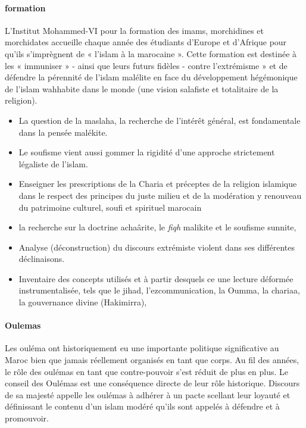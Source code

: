 \paragraph{formation}
L'Institut Mohammed-VI pour la formation des imams, morchidines et morchidates  
 accueille chaque année des étudiants d'Europe et d'Afrique pour qu'ils s'imprègnent de « l'islam à la marocaine ». Cette formation est destinée à les « immuniser » - ainsi que leurs futurs fidèles - contre l'extrémisme » et de  défendre la pérennité de l'islam malélite en face du développement hégémonique de l'islam wahhabite dans le monde (une vision salafiste et totalitaire de la religion).
 \begin{itemize}
     \item La question de la maslaha, la recherche de l'intérêt général, est fondamentale dans la pensée malékite.
     \item  Le soufisme vient aussi gommer la rigidité d'une approche strictement légaliste de l'islam.
     

\item Enseigner les prescriptions de la Charia et préceptes de la religion islamique dans le respect des principes du juste milieu et de la modération y renouveau du patrimoine culturel, soufi et spirituel marocain 
\item la recherche sur la doctrine achaârite, le \textit{fiqh} malikite et le soufisme sunnite,
\item Analyse (déconstruction) du discours extrémiste violent dans ses différentes déclinaisons.
\item Inventaire des concepts utilisés et à partir desquels ce une lecture déformée instrumentalisée, tels que le jihad, l'ezcommunication, la Oumma, la chariaa, la gouvernance divine (Hakimirra),
 \end{itemize}
  






\paragraph{Oulemas} Les ouléma ont historiquement eu une importante politique significative au Maroc bien que jamais réellement organisés en tant que corps.
  Au fil des années, le rôle des oulémas en tant que contre-pouvoir s'est réduit de plus en plus.
Le conseil des Oulémas est une conséquence directe de leur rôle historique. 
Discours de sa majesté appelle les oulémas à adhérer à un pacte scellant leur loyauté et définissant le contenu d'un islam modéré qu'ils sont appelés à défendre et à promouvoir.

